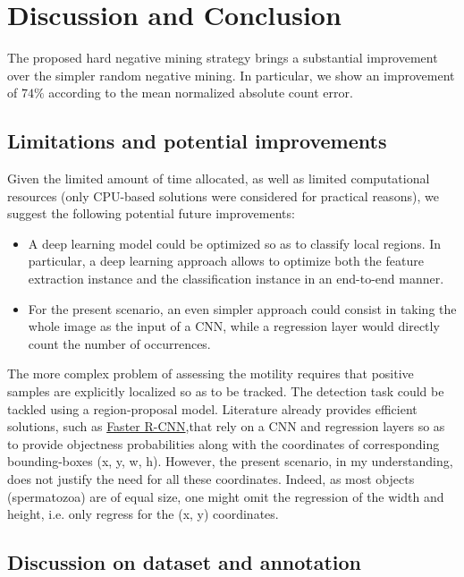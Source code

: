 \documentclass[11pt]{article}
\begin{document}
\section{Discussion and Conclusion}
\label{sec:org654c7a9}

The proposed hard negative mining strategy brings a substantial improvement over the simpler random negative mining.
In particular, we show an improvement of \(74\%\) according to the mean normalized absolute count error.

\subsection{Limitations and potential improvements}
\label{sec:org6d7bc28}

Given the limited amount of time allocated, as well as limited computational resources (only CPU-based solutions were considered for practical reasons), we suggest the following potential future improvements:

\begin{itemize}
\item A deep learning model could be optimized so as to classify local regions. In particular, a deep learning approach allows
to optimize both the feature extraction instance and the classification instance in an end-to-end manner.
\item For the present scenario, an even simpler approach could consist in taking the whole image as the input of a CNN,
while a regression layer would directly count the number of occurrences.
\end{itemize}

The more complex problem of assessing the motility requires that positive samples are explicitly localized so as to be tracked.
The detection task could be tackled using a region-proposal model.
Literature already provides efficient solutions, such as \href{https://arxiv.org/abs/1506.01497}{Faster R-CNN},that rely on a CNN and regression layers so as to provide
objectness probabilities along with the coordinates of corresponding bounding-boxes (x, y, w, h).
However, the present scenario, in my understanding, does not justify the need for all these coordinates.
Indeed, as most objects (spermatozoa) are of equal size, one might omit the regression of the width and height,
i.e. only regress for the (x, y) coordinates.

\subsection{Discussion on dataset and annotation}
\label{sec:org4366d42}
\end{document}
